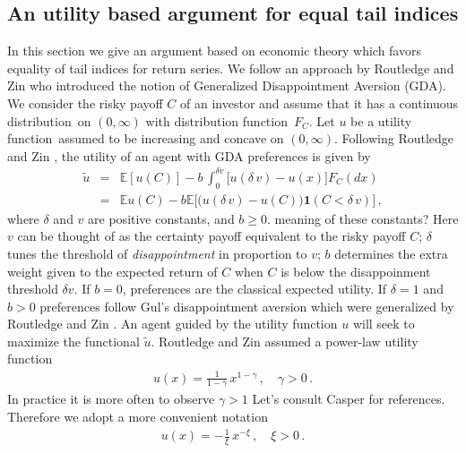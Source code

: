 \documentclass[11pt,a4]{amsart}
\newcommand{\red}{\color{darkred}}
\newcommand{\blue}{\color{darkblue}}
\newcommand{\df}{distribution function}
\newcommand{\beao}{\begin{eqnarray*}}
\newcommand{\eeao}{\end{eqnarray*}\noindent}
\newcommand{\beam}{\begin{eqnarray}}
\newcommand{\eeam}{\end{eqnarray}\noindent}
\newcommand{\wt}{\widetilde}
\newcommand{\fct}{function}
\newcommand{\ds}{distribution}
\newcommand{\E }{{\mathbb E}}
\newcommand{\1}{{\mathbf 1}}
\begin{document}
\subsection{An utility based argument for equal tail indices} \setcounter{equation}{0}\label{sec:3}
In this section we give an argument based on economic theory which  favors equality of  tail indices for return series.
We follow an approach by Routledge and Zin \cite{routledge2010generalized} who introduced the notion of
Generalized Disappointment Aversion (GDA). We consider the risky payoff $C$ of an investor and assume that
it has a continuous \ds\ on $(0,\infty)$ with \df\ $F_C$. Let $u$ be a utility \fct\ assumed to be increasing and concave on $(0,\infty)$.
Following Routledge and Zin \cite{routledge2010generalized},
the utility of an agent with GDA preferences is given by
\beao%
  \wt u&=& \E [u(C)] - b\, \int_{0}^{\delta v}
  \big[ u(\delta \,v) - u(x) \big] F_C(dx)\nonumber\\&=& \E u(C) - b \E\big[\big(u(\delta \,v) - u(C)\big)\1( C < \delta \,v)\big]\,,
\eeao
where $\delta $ and $v$ are positive constants, and $b\ge 0$. {\red
  meaning of these constants?}
{\blue 
 Here $v$ can be thought of as the certainty payoff equivalent to the
 risky payoff $C$; $\delta$ tunes the threshold of {\em
   disappointment} in proportion to $v$; $b$ determines the extra
 weight given to the expected return of $C$ when $C$ is below the
 disappoinment threshold $\delta v$.
 If $b=0$, preferences are the classical expected utility. If
 $\delta=1$ and $b>0$ preferences follow Gul's \cite{gul:1991} 
disappointment aversion which were generalized by Routledge and Zin
\cite{routledge2010generalized}.
}
An agent guided by the utility function $u$ will seek to maximize the
\fct al $\wt u$.
Routledge and Zin assumed a power-law utility function 
\beam\label{eq:u}
u(x)=\frac{1}{1 - \gamma}\,x^{1 - \gamma}\,,\quad \gamma>0\,. 
\eeam
In practice it is more often to observe $\gamma > 1$ {\blue Let's
consult Casper for references.} Therefore we adopt a more convenient
notation
\beao
u(x)=-\frac{1}{\xi}\,x^{-\xi}\,,\quad \xi>0\,. 
\eeao
  
\end{document}
